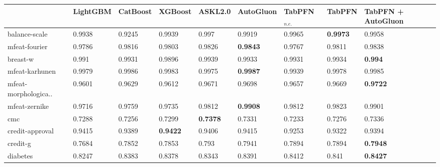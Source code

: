 \begin{tabular}{@{\hskip 0mm}
l@{\hskip 1mm}
l@{\hskip 1mm}
l@{\hskip 1mm}
l@{\hskip 1mm}
l@{\hskip 1mm}
l@{\hskip 1mm}
l@{\hskip 1mm}
l@{\hskip 1mm}
l@{\hskip 0mm}}
\toprule
{} &        LightGBM &        CatBoost &          XGBoost &          ASKL2.0 &               AutoGluon &  TabPFN$_{n.e.}$ &           TabPFN &        TabPFN + AutoGluon \\
\midrule
balance-scale        &          0.9938 &          0.9245 &           0.9939 &            0.997 &                  0.9919 &           0.9965 &  \textbf{0.9973} &                    0.9958 \\
mfeat-fourier        &          0.9786 &          0.9816 &           0.9803 &           0.9826 &         \textbf{0.9843} &           0.9767 &           0.9811 &                    0.9838 \\
breast-w             &           0.991 &          0.9931 &           0.9896 &           0.9939 &                  0.9933 &           0.9931 &           0.9934 &            \textbf{0.994} \\
mfeat-karhunen       &          0.9979 &          0.9986 &           0.9983 &           0.9975 &         \textbf{0.9987} &           0.9939 &           0.9978 &                    0.9985 \\
mfeat-morphologica.. &          0.9601 &          0.9629 &           0.9612 &           0.9671 &                  0.9698 &           0.9657 &           0.9669 &           \textbf{0.9722} \\
mfeat-zernike        &          0.9716 &          0.9759 &           0.9735 &           0.9812 &         \textbf{0.9908} &           0.9812 &           0.9823 &                    0.9901 \\
cmc                  &          0.7288 &          0.7256 &           0.7299 &  \textbf{0.7378} &                  0.7331 &           0.7233 &           0.7276 &                    0.7336 \\
credit-approval      &          0.9415 &          0.9389 &  \textbf{0.9422} &           0.9406 &                  0.9415 &           0.9253 &           0.9322 &                    0.9394 \\
credit-g             &          0.7684 &          0.7852 &           0.7853 &            0.793 &                  0.7941 &           0.7894 &           0.7894 &           \textbf{0.7948} \\
diabetes             &          0.8247 &          0.8383 &           0.8378 &           0.8343 &                  0.8391 &           0.8412 &            0.841 &           \textbf{0.8427} \\

\end{tabular}
